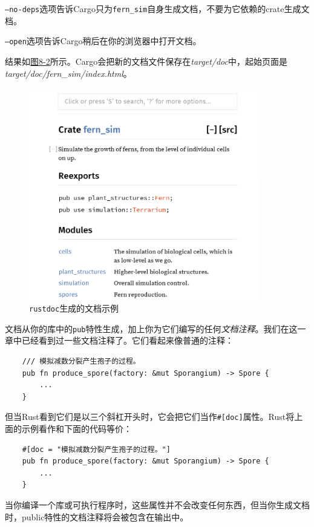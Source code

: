 \texttt{--no-deps}选项告诉Cargo只为\texttt{fern\_sim}自身生成文档，不要为它依赖的crate生成文档。

\texttt{--open}选项告诉Cargo稍后在你的浏览器中打开文档。

结果如\hyperref[f8-2]{图8-2}所示。Cargo会把新的文档文件保存在\emph{target/doc}中，起始页面是\\
\emph{target/doc/fern\_sim/index.html}。

\begin{figure}[htbp]
    \centering
    \includegraphics[width=0.9\textwidth]{../img/f8-2.png}
    \caption{\texttt{rustdoc}生成的文档示例}
    \label{f8-2}
\end{figure}

文档从你的库中的\texttt{pub}特性生成，加上你为它们编写的任何\emph{文档注释}。我们在这一章中已经看到过一些文档注释了。它们看起来像普通的注释：
\begin{verbatim}
    /// 模拟减数分裂产生孢子的过程。
    pub fn produce_spore(factory: &mut Sporangium) -> Spore {
        ...
    }
\end{verbatim}
但当Rust看到它们是以三个斜杠开头时，它会把它们当作\texttt{\#[doc]}属性。Rust将上面的示例看作和下面的代码等价：
\begin{verbatim}
    #[doc = "模拟减数分裂产生孢子的过程。"]
    pub fn produce_spore(factory: &mut Sporangium) -> Spore {
        ...
    }
\end{verbatim}

当你编译一个库或可执行程序时，这些属性并不会改变任何东西，但当你生成文档时，public特性的文档注释将会被包含在输出中。

